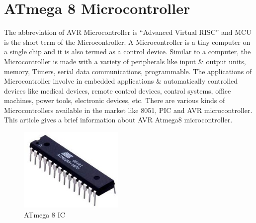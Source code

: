 \documentclass[twoside,a4paper,16pt]{book}
\begin{document}
{{			\section{ATmega 8 Microcontroller }
			The abbreviation of AVR Microcontroller is “Advanced Virtual RISC” and MCU is the short term of the Microcontroller. A Microcontroller is a tiny computer on a single chip and it is also termed as a control device. Similar to a computer, the Microcontroller is made with a variety of peripherals like input \& output units, memory, Timers, serial data communications, programmable. The applications of Microcontroller involve in embedded applications \& automatically controlled devices like medical devices, remote control devices, control systems, office machines, power tools, electronic devices, etc. There are various kinds of Microcontrollers available in the market like 8051, PIC and AVR microcontroller. This article gives a brief information about AVR Atmega8 microcontroller.
			\begin{figure}[ht!]
				\begin{center}
					\includegraphics[width=5.0cm]{8.jpg}
					\caption{ATmega 8 IC}
				\end{center}
			\end{figure}
}}
\end{document}
